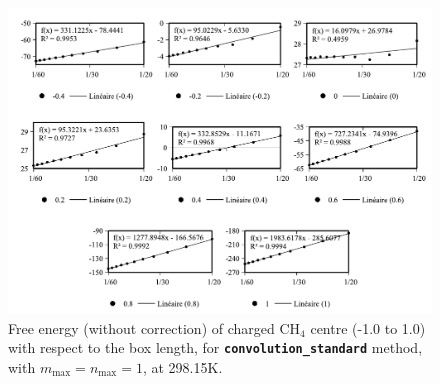 \begin{figure}[!bh]
\begin{centering}
\includegraphics[width=0.95\columnwidth]{_figure/results/ch4_nmax1_new}
\par\end{centering}
\caption{Free energy (without correction) of charged $\mathrm{C}\mathrm{H}_{4}$
centre (-1.0 to 1.0) with respect to the box length, for \texttt{\textbf{convolution\_standard}}
method, with $m_{\max}=n_{\max}=1$, at 298.15K.\label{fig:ch4_nmax1_new}}
\end{figure}

